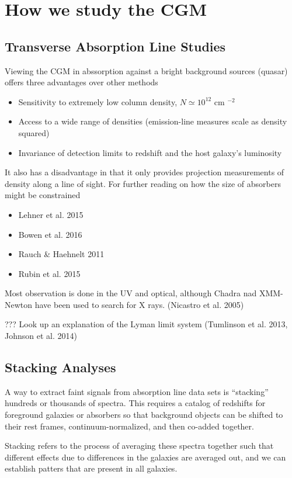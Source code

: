 \documentclass[12pt]{article}
\begin{document}
\section{How we study the CGM}

\subsection{Transverse Absorption Line Studies}
Viewing the CGM in abssorption against a bright background sources (quasar) offers three advantages over other methods
\begin{itemize}
\item{Sensitivity to extremely low column density, $N \simeq 10^{12}$ cm $^{-2}$}
\item{Access to a wide range of densities (emission-line measures scale as density squared)}
\item{Invariance of detection limits to redshift and the host galaxy's luminosity}
\end{itemize}

It also has a disadvantage in that it only provides projection measurements of density along a line of sight.
For further reading on how the size of absorbers might be constrained
\begin{itemize}
\item{Lehner et al. 2015}
\item{Bowen et al. 2016}
\item{Rauch \& Haehnelt 2011}
\item{Rubin et al. 2015}
\end{itemize}

Most observation is done in the UV and optical, although Chadra nad XMM-Newton have been used to search for X rays.
(Nicastro et al. 2005)

??? Look up an explanation of the Lyman limit system
(Tumlinson et al. 2013, Johnson et al. 2014)

\subsection{Stacking Analyses}
A way to extract faint signals from absorption line data sets is ``stacking'' hundreds or thousands of spectra.
This requires a catalog of redshifts for foreground galaxies or absorbers so that background objects can be shifted
to their rest frames, continuum-normalized, and then co-added together.

Stacking refers to the process of averaging these spectra together such that different effects due to differences
in the galaxies are averaged out, and we can establish patters that are present in all galaxies. 
\end{document}
